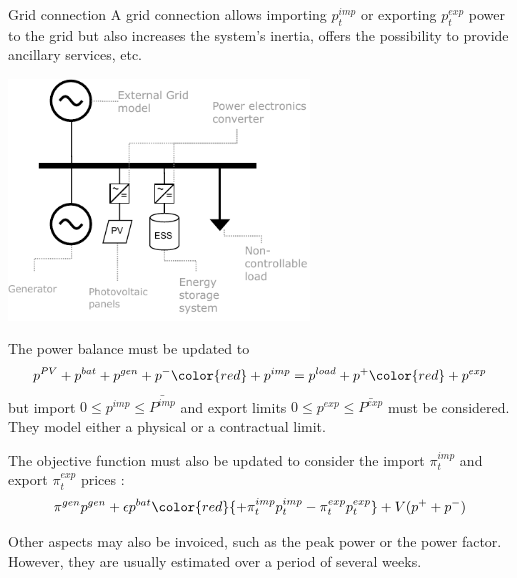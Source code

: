 \begin{frame}[allowframebreaks]{Grid connection}
    A grid connection allows importing $p^{imp}_t$ or exporting $p^{exp}_t$ power to the grid but also increases the system's inertia, offers the possibility to provide ancillary services, etc.
    \begin{center}
    \includegraphics[width=0.6\textwidth]{images/grid_tied_1.pdf}
    \end{center}
    
    The power balance must be updated to 
    $$p^{PV}+p^{bat} +p^{gen} + p^- {\color{red} + p^{imp}}  = p^{load} + p^+ {\color{red} + p^{exp}} $$
    but import $0 \leq p^{imp} \leq \bar{P^{imp}}$ and export limits $0 \leq p^{exp} \leq \bar{P^{exp}}$ must be considered. 
    They model either a physical or a contractual limit.

    The objective function must also be updated to consider the import $\pi^{imp}_t$ and export $\pi^{exp}_t$ prices : 
    $$\pi^{gen} p^{gen}  + \epsilon p^{bat} {\color{red}{+ \pi^{imp}_t p^{imp}_t - \pi^{exp}_t p^{exp}_t}} + V (p^+ + p^-)$$

    Other aspects may also be invoiced, such as the peak power or the power factor. However, they are usually estimated over a period of several weeks.
\end{frame}


